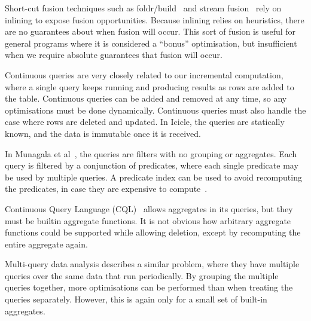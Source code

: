 



Short-cut fusion techniques such as foldr/build~\cite{gill1993short} and stream fusion~\cite{coutts2007stream} rely on inlining to expose fusion opportunities.
Because inlining relies on heuristics, there are no guarantees about when fusion will occur.
This sort of fusion is useful for general programs where it is considered a ``bonus'' optimisation, but insufficient when we require absolute guarantees that fusion will occur.


Continuous queries are very closely related to our incremental computation, where a single query keeps running and producing results as rows are added to the table.
Continuous queries can be added and removed at any time, so any optimisations must be done dynamically.
Continuous queries must also handle the case where rows are deleted and updated.
In Icicle, the queries are statically known, and the data is immutable once it is received.

In Munagala et al~\cite{munagala2007optimization}, the queries are filters with no grouping or aggregates.
Each query is filtered by a conjunction of predicates, where each single predicate may be used by multiple queries.
A predicate index can be used to avoid recomputing the predicates, in case they are expensive to compute~\cite{madden2002continuously}.

Continuous Query Language (CQL)~\cite{arasu2002abstract,stream2003stream} allows aggregates in its queries, but they must be builtin aggregate functions.
It is not obvious how arbitrary aggregate functions could be supported while allowing deletion, except by recomputing the entire aggregate again.

Multi-query data analysis\cite{andrade2003efficient} describes a similar problem, where they have multiple queries over the same data that run periodically.
By grouping the multiple queries together, more optimisations can be performed than when treating the queries separately.
However, this is again only for a small set of built-in aggregates.


